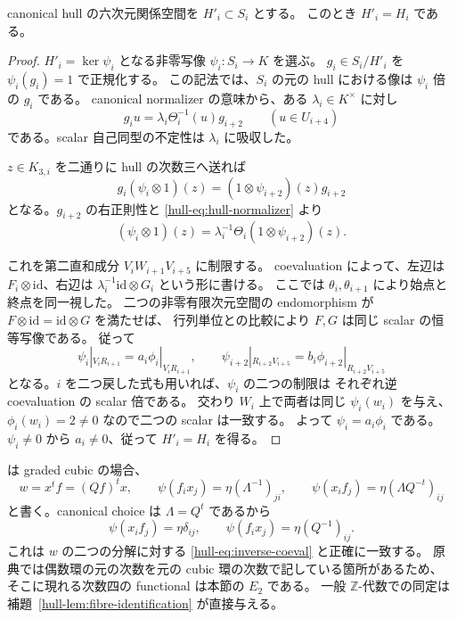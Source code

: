 \begin{lemma}[正規化式が決める評価の一意性]
\label{hull-lem:fibre-identification}
canonical hull の六次元関係空間を $H'_i\subset S_i$ とする。
このとき $H'_i=H_i$ である。
\end{lemma}
\begin{proof}
$H'_i=\ker\psi_i$ となる非零写像 $\psi_i:S_i\to K$ を選ぶ。
$g_i\in S_i/H'_i$ を $\psi_i(g_i)=1$ で正規化する。
この記法では、$S_i$ の元の hull における像は $\psi_i$ 倍の $g_i$ である。
canonical normalizer の意味から、ある $\lambda_i\in K^\times$ に対し
\[
 g_i u=\lambda_i\Theta_i^{-1}(u)g_{i+2}
 \qquad(u\in U_{i+4})
 \tag{UH-13}\label{hull-eq:hull-normalizer}
\]
である。scalar 自己同型の不定性は $\lambda_i$ に吸収した。

$z\in K_{3,i}$ を二通りに hull の次数三へ送れば
\[
 g_i(\psi_i\otimes1)(z)
   =(1\otimes\psi_{i+2})(z)g_{i+2}
\]
となる。$g_{i+2}$ の右正則性と \eqref{hull-eq:hull-normalizer} より
\[
 (\psi_i\otimes1)(z)
   =\lambda_i^{-1}\Theta_i(1\otimes\psi_{i+2})(z).
 \tag{UH-14}\label{hull-eq:psi-normalizer}
\]

これを第二直和成分 $V_iW_{i+1}V_{i+5}$ に制限する。
coevaluation によって、左辺は $F_i\otimes\mathrm{id}$、右辺は
$\lambda_i^{-1}\mathrm{id}\otimes G_i$ という形に書ける。
ここでは $\theta_i,\theta_{i+1}$ により始点と終点を同一視した。
二つの非零有限次元空間の endomorphism が
$F\otimes\mathrm{id}=\mathrm{id}\otimes G$ を満たせば、
行列単位との比較により $F,G$ は同じ scalar の恒等写像である。
従って
\[
 \psi_i|_{V_iR_{i+1}}=a_i\phi_i|_{V_iR_{i+1}},\qquad
 \psi_{i+2}|_{R_{i+2}V_{i+5}}
       =b_i\phi_{i+2}|_{R_{i+2}V_{i+5}}
\]
となる。$i$ を二つ戻した式も用いれば、$\psi_i$ の二つの制限は
それぞれ逆 coevaluation の scalar 倍である。
交わり $W_i$ 上で両者は同じ $\psi_i(w_i)$ を与え、
$\phi_i(w_i)=2\ne0$ なので二つの scalar は一致する。
よって $\psi_i=a_i\phi_i$ である。
$\psi_i\ne0$ から $a_i\ne0$、従って $H'_i=H_i$ を得る。
\end{proof}

\begin{remark}
\cite[Proposition 2.7, (2.11), Remark 3.3]{BauwensVanDenBergh1998} は graded cubic の場合、
\[
 w=x^tf=(Qf)^tx,\qquad
 \psi(f_i x_j)=\eta(\Lambda^{-1})_{ji},\qquad
 \psi(x_i f_j)=\eta(\Lambda Q^{-t})_{ij}
\]
と書く。canonical choice は $\Lambda=Q^t$ であるから
\[
 \psi(x_i f_j)=\eta\delta_{ij},\qquad
 \psi(f_i x_j)=\eta(Q^{-1})_{ij}.
 \tag{UH-15}\label{hull-eq:BV-convention}
\]
これは $w$ の二つの分解に対する \eqref{hull-eq:inverse-coeval} と正確に一致する。
原典では偶数環の元の次数を元の cubic 環の次数で記している箇所があるため、
そこに現れる次数四の functional は本節の $E_2$ である。
一般 $\mathbb Z$-代数での同定は補題~\ref{hull-lem:fibre-identification} が直接与える。
\end{remark}

